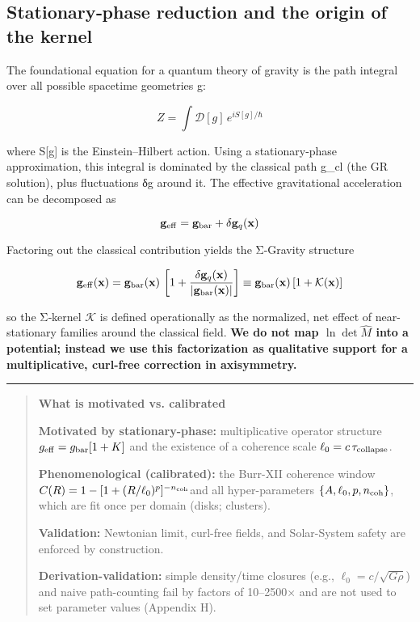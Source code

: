 \documentclass[11pt,a4paper]{article}
\begin{document}
\subsection{Stationary‑phase reduction and the origin of the kernel}


The foundational equation for a quantum theory of gravity is the path integral over all possible spacetime geometries g:


\begin{equation}
Z = \int \mathcal{D}[g] \, e^{iS[g]/\hbar}
\end{equation}


where S[g] is the Einstein–Hilbert action. Using a stationary‑phase approximation, this integral is dominated by the classical path g\_cl (the GR solution), plus fluctuations δg around it. The effective gravitational acceleration can be decomposed as


\begin{equation}
\mathbf{g}_{\rm eff} = \mathbf{g}_{\rm bar} + \delta\mathbf{g}_q(\mathbf{x})
\end{equation}


Factoring out the classical contribution yields the Σ‑Gravity structure


\begin{equation}
\mathbf{g}_{\rm eff}(\mathbf{x}) = \mathbf{g}_{\rm bar}(\mathbf{x})\,\left[1 + \frac{\delta\mathbf{g}_q(\mathbf{x})}{\lvert\mathbf{g}_{\rm bar}(\mathbf{x})\rvert}\right] \equiv \mathbf{g}_{\rm bar}(\mathbf{x})\,[1+\mathcal{K}(\mathbf{x})]
\end{equation}


so the Σ‑kernel $\mathcal{K}$ is defined operationally as the normalized, net effect of near-stationary families around the classical field. \textbf{We do not map $\ln\det\hat{M}$ into a potential; instead we use this factorization as qualitative support for a multiplicative, curl-free correction in axisymmetry.}


\medskip\hrule\medskip


\begin{quote}
\textbf{What is motivated vs. calibrated}



\textbf{Motivated by stationary-phase:} multiplicative operator structure $g_{\rm eff}=g_{\rm bar}[1+K]$ and the existence of a coherence scale $\allowbreak \ell_0=c\,\tau_{\rm collapse}$\allowbreak .



\textbf{Phenomenological (calibrated):} the Burr-XII coherence window $\allowbreak C(R)=1-[1+(R/\ell_0)^p]^{-n_{\rm coh}}$\allowbreak  and all hyper-parameters $\{A,\ell_0,p,n_{\rm coh}\}$, which are fit once per domain (disks; clusters).



\textbf{Validation:} Newtonian limit, curl-free fields, and Solar-System safety are enforced by construction.



\textbf{Derivation-validation:} simple density/time closures (e.g., $\ell_0=c/\sqrt{G\rho}$) and naive path-counting fail by factors of 10–2500× and are not used to set parameter values (Appendix H).

\end{quote}
\end{document}
